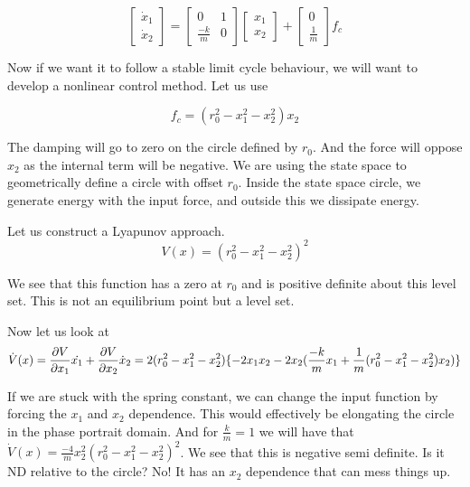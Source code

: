 \documentclass[11pt]{article}
\begin{document}
\begin{equation}
\begin{bmatrix}
\dot{x}_1 \\
\dot{x}_2
\end{bmatrix}
 = 
\begin{bmatrix}
0 & 1 \\
\frac{-k}{m} & 0
\end{bmatrix}
\begin{bmatrix}
{x}_1 \\
{x}_2
\end{bmatrix}
+
\begin{bmatrix}
0 \\
\frac{1}{m}
\end{bmatrix}
f_c
\end{equation}

Now if we want it to follow a stable limit cycle behaviour, we will want to develop a nonlinear control method. Let us use

\begin{equation}
	f_c = (r_0^2 - x_1^2 -x_2^2)x_2
\end{equation}

The damping will go to zero on the circle defined by $r_0$. And the force will oppose $x_2$ as the internal term will be negative. We are using the state space to geometrically define a circle with offset $r_0$. Inside the state space circle, we generate energy with the input force, and outside this we dissipate energy. 

Let us construct a Lyapunov approach. 
\begin{equation}
	V(x) = (r_0^2 - x_1^2 -x_2^2)^2
\end{equation}

We see that this function has a zero at $r_0$ and is positive definite about this level set. This is not an equilibrium point but a level set. 

Now let us look at
\begin{equation}
	\dot{V}(x) = \frac{\partial V}{\partial x_1}\dot{x_1} + \frac{\partial V}{\partial x_2}\dot{x}_2 = \\
	2(r_0^2 - x_1^2 -x_2^2) \{ -2x_1x_2 - 2x_2(\frac{-k}{m}x_1 + \frac{1}{m}(r_0^2 - x_1^2 -x_2^2)x_2) \}
\end{equation}

If we are stuck with the spring constant, we can change the input function by forcing the $x_1$ and $x_2$ dependence. This would effectively be elongating the circle in the phase portrait domain. And for $\frac{k}{m} = 1$ we will have that $\dot{V}(x) = \frac{-4}{m}x_2^2(r_0^2 - x_1^2 -x_2^2)^2$. We see that this is negative semi definite. Is it ND relative to the circle? No! It has an $x_2$ dependence that can mess things up. 
\end{document}

